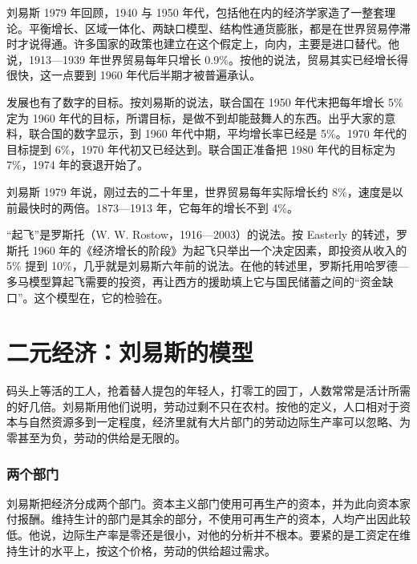 刘易斯 1979 年回顾，1940 与 1950 年代，包括他在内的经济学家造了一整套理论\cite{lewis1979}。平衡增长、区域一体化、两缺口模型、结构性通货膨胀，都是在世界贸易停滞时才说得通\cite{lewis1979}。许多国家的政策也建立在这个假定上，向内，主要是进口替代\cite{lewis1979}。他说，1913—1939 年世界贸易每年只增长 0.9\%\cite{lewis1979}。按他的说法，贸易其实已经增长得很快，这一点要到 1960 年代后半期才被普遍承认\cite{lewis1979}。

发展也有了数字的目标。按刘易斯的说法，联合国在 1950 年代末把每年增长 5\% 定为 1960 年代的目标，所谓目标，是做不到却能鼓舞人的东西\cite{lewis1979}。出乎大家的意料，联合国的数字显示，到 1960 年代中期，平均增长率已经是 5\%\cite{lewis1979}。1970 年代的目标提到 6\%，1970 年代初又已经达到\cite{lewis1979}。联合国正准备把 1980 年代的目标定为 7\%，1974 年的衰退开始了\cite{lewis1979}。

刘易斯 1979 年说，刚过去的二十年里，世界贸易每年实际增长约 8\%，速度是以前最快时的两倍\cite{lewis1979}。1873—1913 年，它每年的增长不到 4\%\cite{lewis1979}。

“起飞”是罗斯托（W. W. Rostow，1916—2003）的说法\cite{loc41,gnd41}。按 Easterly 的转述，罗斯托 1960 年的《经济增长的阶段》为起飞只举出一个决定因素，即投资从收入的 5\% 提到 10\%，几乎就是刘易斯六年前的说法\cite{easterly1997}。在他的转述里，罗斯托用哈罗德—多马模型算起飞需要的投资，再让西方的援助填上它与国民储蓄之间的“资金缺口”\cite{easterly1997}。这个模型在，它的检验在。

\section{二元经济：刘易斯的模型}\label{sec:development-lewis}

码头上等活的工人，抢着替人提包的年轻人，打零工的园丁，人数常常是活计所需的好几倍\cite{lewis1954}。刘易斯用他们说明，劳动过剩不只在农村。按他的定义，人口相对于资本与自然资源多到一定程度，经济里就有大片部门的劳动边际生产率可以忽略、为零甚至为负，劳动的供给是无限的\cite{lewis1954}。

\subsubsection{两个部门}

刘易斯把经济分成两个部门\cite{lewis1954}。资本主义部门使用可再生产的资本，并为此向资本家付报酬。维持生计的部门是其余的部分，不使用可再生产的资本，人均产出因此较低\cite{lewis1954}。他说，边际生产率是零还是很小，对他的分析并不根本。要紧的是工资定在维持生计的水平上，按这个价格，劳动的供给超过需求\cite{lewis1954}。

